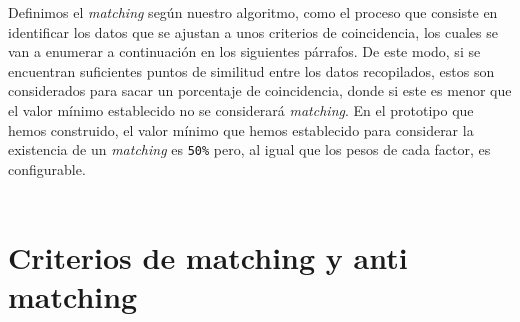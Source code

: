\documentclass[11pt]{book}
\begin{document}
	Definimos el \emph{matching} según nuestro algoritmo, como el proceso que consiste en identificar los datos que se ajustan a unos criterios de coincidencia, los cuales se van a enumerar a continuación en los siguientes párrafos. De este modo, si se encuentran suficientes puntos de similitud entre los datos recopilados, estos son considerados para sacar un porcentaje de coincidencia, donde si este es menor que el valor mínimo establecido no se considerará \emph{matching}. En el prototipo que hemos construido, el valor mínimo que hemos
	establecido para considerar la existencia de un \emph{matching} es \texttt{50\%} pero, al
	igual que los pesos de cada factor, es configurable.
	\\\\
	\section{Criterios de matching y anti matching}
\end{document}
